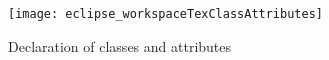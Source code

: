 \begin{itemize}
\newpage

\vspace*{3cm}

\begin{figure}[htbp]
	\centering
  \texttt{[image: eclipse\_workspaceTexClassAttributes]}
	\caption{Declaration of classes and attributes}
	\label{fig:workspaceClassAttributes}
\end{figure} 


\end{itemize}
